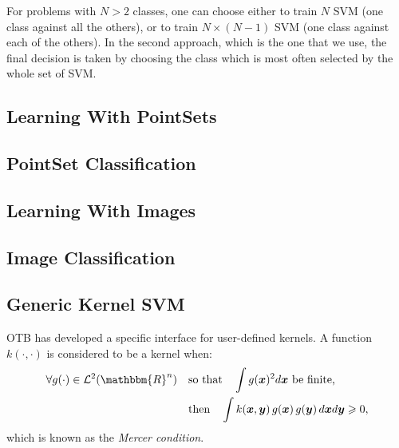 For problems with $N > 2$ classes, one can choose either to train $N$
SVM (one class against all the others), or to train $N\times(N-1)$ SVM
(one class against each of the others). In the second approach, which
is the one that we use, the final decision is taken by choosing the
class which is most often selected by the whole set of SVM.


\subsection{Learning With PointSets}
\label{sec:LearningWithPointSets}

\subsection{PointSet Classification}
\label{sec:PointSetClassification}

\subsection{Learning With Images}
\label{sec:LearningWithImages}

\subsection{Image Classification}
\label{sec:ImageClassification}


\subsection{Generic Kernel SVM}

OTB has developed a specific interface for user-defined kernels. A function
$k(\cdot,\cdot)$ is considered to be a kernel when:
\begin{align}\label{eqMercer}
        \forall g(\cdot) \in {\cal L}^2(\mathbbm{R}^n) \quad & \text{so 
that} \quad
        \int g(\boldsymbol{x})^2 d\boldsymbol{x} \text{ be finite,} \\
        & \text{then} \quad \int k(\boldsymbol{x},\boldsymbol{y}) \, 
g(\boldsymbol{x})
        \, g(\boldsymbol{y}) \, d\boldsymbol{x} d\boldsymbol{y} \geqslant 0,
        \notag
\end{align}
which is known as the {\em Mercer condition\/}.

